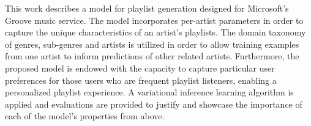 This work describes a model for playlist generation designed for Microsoft's Groove music service. The model incorporates per-artist parameters in order to capture the unique characteristics of an artist's playlists. The domain taxonomy of genres, sub-genres and artists is utilized in order to allow training examples from one artist to inform predictions of other related artists. 
Furthermore, the proposed model is endowed with the capacity to capture particular user preferences for those users who are frequent playlist listeners, enabling a personalized playlist experience. %
A variational inference learning algorithm is applied and evaluations are provided to justify and showcase the importance of each of the model's properties from above. 


